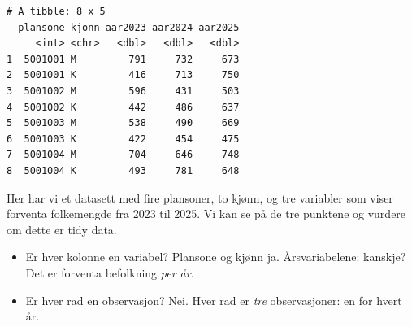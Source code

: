\documentclass[
  letterpaper,
  DIV=11,
  numbers=noendperiod]{scrreprt}
\providecommand{\tightlist}{%
  \setlength{\itemsep}{0pt}\setlength{\parskip}{0pt}}\usepackage{longtable,booktabs,array}
\begin{document}
\begin{verbatim}
# A tibble: 8 x 5
  plansone kjonn aar2023 aar2024 aar2025
     <int> <chr>   <dbl>   <dbl>   <dbl>
1  5001001 M         791     732     673
2  5001001 K         416     713     750
3  5001002 M         596     431     503
4  5001002 K         442     486     637
5  5001003 M         538     490     669
6  5001003 K         422     454     475
7  5001004 M         704     646     748
8  5001004 K         493     781     648
\end{verbatim}

Her har vi et datasett med fire plansoner, to kjønn, og tre variabler
som viser forventa folkemengde fra 2023 til 2025. Vi kan se på de tre
punktene og vurdere om dette er tidy data.

\begin{itemize}
\tightlist
\item
  Er hver kolonne en variabel? Plansone og kjønn ja. Årsvariabelene:
  kanskje? Det er forventa befolkning \emph{per år}.
\item
  Er hver rad en observasjon? Nei. Hver rad er \emph{tre} observasjoner:
  en for hvert år.
\end{itemize}
\end{document}
